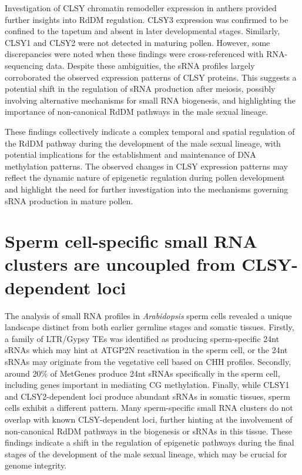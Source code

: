 Investigation of CLSY chromatin remodeller expression in anthers provided further insights into RdDM regulation. CLSY3 expression was confirmed to be confined to the tapetum and absent in later developmental stages. Similarly, CLSY1 and CLSY2 were not detected in maturing pollen. However, some discrepancies were noted when these findings were cross-referenced with RNA-sequencing data. Despite these ambiguities, the sRNA profiles largely corroborated the observed expression patterns of CLSY proteins. This suggests a potential shift in the regulation of sRNA production after meiosis, possibly involving alternative mechanisms for small RNA biogenesis, and highlighting the importance of non-canonical RdDM pathways in the male sexual lineage.

These findings collectively indicate a complex temporal and spatial regulation of the RdDM pathway during the development of the male sexual lineage, with potential implications for the establishment and maintenance of DNA methylation patterns. The observed changes in CLSY expression patterns may reflect the dynamic nature of epigenetic regulation during pollen development and highlight the need for further investigation into the mechanisms governing sRNA production in mature pollen.

\section{Sperm cell-specific small RNA clusters are uncoupled from CLSY-dependent loci}

The analysis of small RNA profiles in \textit{Arabidopsis} sperm cells revealed a unique landscape distinct from both earlier germline stages and somatic tissues. Firstly, a family of LTR/Gypsy TEs was identified as producing sperm-specific 24nt sRNAs which may hint at ATGP2N reactivation in the sperm cell, or the 24nt sRNAs may originate from the vegetative cell based on CHH profiles. Secondly, around 20\% of MetGenes produce 24nt sRNAs specifically in the sperm cell, including genes important in mediating CG methylation. Finally, while CLSY1 and CLSY2-dependent loci produce abundant sRNAs in somatic tissues, sperm cells exhibit a different pattern. Many sperm-specific small RNA clusters do not overlap with known CLSY-dependent loci, further hinting at the involvement of non-canonical RdDM pathways in the biogenesis or sRNAs in this tissue. These findings indicate a shift in the regulation of epigenetic pathways during the final stages of the development of the male sexual lineage, which may be crucial for genome integrity. 

